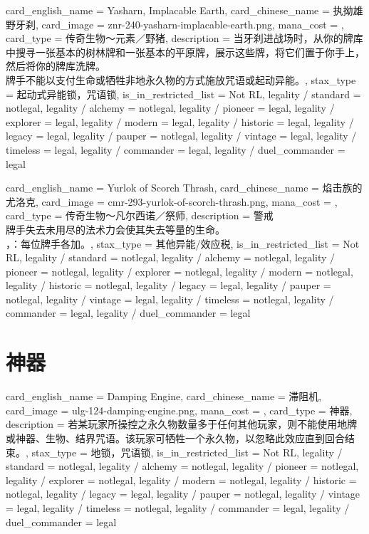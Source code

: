 \documentclass[lang = cn, color = black, 10pt]{AllThatStax}
\begin{document}
\card
{
	card_english_name = {Yasharn, Implacable Earth},
	card_chinese_name = {执拗雄野牙刹},
	card_image = znr-240-yasharn-implacable-earth.png,
	mana_cost = ,
	card_type = 传奇生物～元素／野猪,
	description = {当牙刹进战场时，从你的牌库中搜寻一张基本的树林牌和一张基本的平原牌，展示这些牌，将它们置于你手上，然后将你的牌库洗牌。\\
牌手不能以支付生命或牺牲非地永久物的方式施放咒语或起动异能。},
	stax_type = 起动式异能锁，咒语锁,
	is_in_restricted_list = Not RL,
	legality / standard = notlegal,
	legality / alchemy = notlegal,
	legality / pioneer = legal,
	legality / explorer = legal,
	legality / modern = legal,
	legality / historic = legal,
	legality / legacy = legal,
	legality / pauper = notlegal,
	legality / vintage = legal,
	legality / timeless = legal,
	legality / commander = legal,
	legality / duel_commander = legal
}

\card
{
	card_english_name = {Yurlok of Scorch Thrash},
	card_chinese_name = {焰击族的尤洛克},
	card_image = cmr-293-yurlok-of-scorch-thrash.png,
	mana_cost = ,
	card_type = 传奇生物～凡尔西诺／祭师,
	description = {警戒\\
牌手失去未用尽的法术力会使其失去等量的生命。\\
，：每位牌手各加。},
	stax_type = 其他异能/效应税,
	is_in_restricted_list = Not RL,
	legality / standard = notlegal,
	legality / alchemy = notlegal,
	legality / pioneer = notlegal,
	legality / explorer = notlegal,
	legality / modern = notlegal,
	legality / historic = notlegal,
	legality / legacy = legal,
	legality / pauper = notlegal,
	legality / vintage = legal,
	legality / timeless = notlegal,
	legality / commander = legal,
	legality / duel_commander = legal
}

\section{神器}

\card
{
	card_english_name = {Damping Engine},
	card_chinese_name = {滞阻机},
	card_image = ulg-124-damping-engine.png,
	mana_cost = ,
	card_type = 神器,
	description = {若某玩家所操控之永久物数量多于任何其他玩家，则不能使用地牌或神器、生物、结界咒语。该玩家可牺牲一个永久物，以忽略此效应直到回合结束。},
	stax_type = 地锁，咒语锁,
	is_in_restricted_list = Not RL,
	legality / standard = notlegal,
	legality / alchemy = notlegal,
	legality / pioneer = notlegal,
	legality / explorer = notlegal,
	legality / modern = notlegal,
	legality / historic = notlegal,
	legality / legacy = legal,
	legality / pauper = notlegal,
	legality / vintage = legal,
	legality / timeless = notlegal,
	legality / commander = legal,
	legality / duel_commander = legal
}
\end{document}
